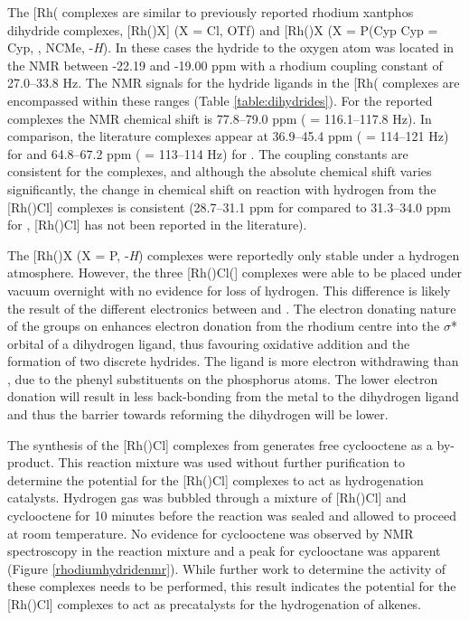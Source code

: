 The [Rh(\tBuxantphosk\ce{)Cl(H)2]} complexes are similar to previously reported rhodium xantphos dihydride complexes,  [Rh(\iPrxantphos)X] (X = Cl, OTf)\cite{Esteruelas2013} and [Rh(\Phxantphos)X\ce{]+} (X = P(\acrshort{Cyp} \acrshort{Cyp} = \acrlong{Cyp}, , NCMe, -\dento{}\emph{H})\cite{Dallanegra2012, Johnson2013, Pawley2010}.   In these cases the hydride \trans{} to the oxygen atom was located in the \proton{} NMR between -22.19 and -19.00 ppm with a rhodium coupling constant of 27.0--33.8 Hz.  The \proton{} NMR signals for the hydride ligands in the [Rh(\tBuxantphosk\ce{)Cl(H)2]} complexes are encompassed within these ranges (Table \ref{table:dihydrides}).  For the reported \tBuxantphos{} complexes the \phosphorus{} NMR chemical shift is 77.8--79.0 ppm (\JRhP{} = 116.1--117.8 Hz).  In comparison, the literature complexes appear at 36.9--45.4 ppm (\JRhP{} = 114--121 Hz) for \Phxantphos{} and 64.8--67.2 ppm (\JRhP{} = 113--114 Hz) for \iPrxantphos{}.  The coupling constants are consistent for the complexes, and although the absolute chemical shift varies significantly, the change in chemical shift on reaction with hydrogen from the [Rh(\tBuxantphos)Cl] complexes is consistent (28.7--31.1 ppm for \iPrxantphos{} compared to 31.3--34.0 ppm for \tBuxantphos{}, [Rh(\Phxantphos)Cl] has not been reported in the literature).  

The [Rh(\Phxantphos)X\ce{]+} (X = P, -\dento{}\emph{H}) complexes were reportedly only stable under a hydrogen atmosphere.\cite{Johnson2013, Dallanegra2012}  However, the three [Rh(\tBuxantphos)Cl(] complexes were able to be placed under vacuum overnight with no evidence for loss of hydrogen.  This difference is likely the result of the different electronics between \tBuxantphos{} and \Phxantphos{}.  The electron donating nature of the \tBu{} groups on \tBuxantphos{} enhances electron donation from the rhodium centre into the $\sigma$* orbital of a dihydrogen ligand, thus favouring oxidative addition and the formation of two discrete hydrides.  The \Phxantphos{} ligand is more electron withdrawing than \tBuxantphos{}, due to the phenyl substituents on the phosphorus atoms.  The lower electron donation will result in less back-bonding from the metal to the dihydrogen ligand and thus the barrier towards reforming the dihydrogen will be lower.

The synthesis of the [Rh(\tBuxantphosk)Cl] complexes from  generates free cyclooctene as a by-product.  This reaction mixture was used without further purification to determine the potential for the [Rh(\tBuxantphosk)Cl] complexes to act as hydrogenation catalysts.  Hydrogen gas was bubbled through a mixture of [Rh(\tBuxantphosk)Cl] and cyclooctene for 10 minutes before the reaction was sealed and allowed to proceed at room temperature.  No evidence for cyclooctene was observed by \proton{} NMR spectroscopy in the reaction mixture and a peak for cyclooctane was apparent (Figure \ref{rhodiumhydridenmr}).  While further work to determine the activity of these complexes needs to be performed, this result indicates the potential for the [Rh(\tBuxantphosk)Cl] complexes to act as precatalysts for the hydrogenation of alkenes.  

